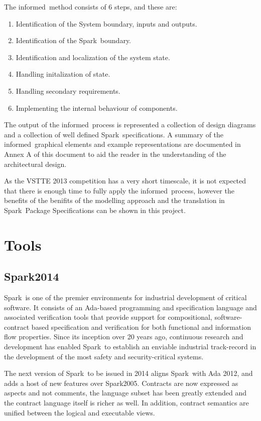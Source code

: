 \documentclass{report}
\newcommand{\spark}[0]{{\sc Spark}}
\newcommand{\informed}[0]{{\sc informed}}
\begin{document}
\noindent
The \informed\ method consists of 6 steps, and these are:

\begin{enumerate}
\item Identification of the System boundary, inputs and outputs.
\item Identification of the \spark\ boundary.
\item Identification and localization of the system state.
\item Handling initalization of state.
\item Handling secondary requirements.
\item Implementing the internal behaviour of components.
\end{enumerate}

\noindent
The output of the \informed\ process is represented a collection of
design diagrams and a collection of well defined \spark\
specifications. A summary of the \informed\ graphical elements and
example representations are documented in Annex A of this document to
aid the reader in the understanding of the architectural design.

As the VSTTE 2013 competition has a very short timescale, it is not
expected that there is enough time to fully apply the \informed\
process, however the benefits of the benifits of the modelling
approach and the translation in \spark\ Package Specifications can be
shown in this project.

\section{Tools}

\subsection{\spark 2014}
\spark\ is one of the premier environments for industrial development
of critical software. It consists of an Ada-based programming and
specification language and associated verification tools that provide
support for compositional, software-contract based specification and
verification for both functional and information flow
properties. Since its inception over 20 years ago, continuous research
and development has enabled \spark\ to establish an enviable
industrial track-record in the development of the most safety and
security-critical systems.

The next version of \spark\ to be issued in 2014 aligns \spark\ with
Ada 2012, and adds a host of new features over \spark 2005. Contracts
are now expressed as aspects and not comments, the language subset has
been greatly extended and the contract language itself is richer as
well. In addition, contract semantics are unified between the logical
and executable views.
\end{document}
